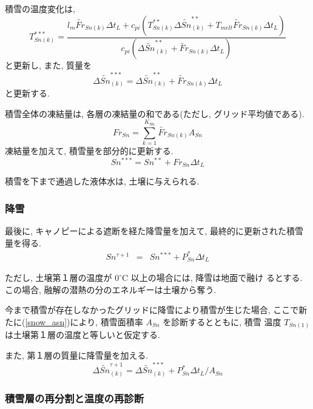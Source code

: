 積雪の温度変化は,
\begin{equation}
 T_{Sn(k)}^{***} = \frac{l_m \widetilde{Fr}_{Sn(k)}\Delta t_L
   +c_{pi}(T_{Sn(k)}^{**}\Delta \widetilde{Sn}_{(k)}^{**} + T_{melt} \widetilde{Fr}_{Sn(k)}\Delta t_L ) }
  {c_{pi} (\Delta \widetilde{Sn}_{(k)}^{**} + \widetilde{Fr}_{Sn(k)}\Delta t_L)}
\end{equation}
と更新し, また, 質量を
\begin{equation}
 \Delta \widetilde{Sn}_{(k)}^{***} = \Delta \widetilde{Sn}_{(k)}^{**} + \widetilde{Fr}_{Sn(k)}\Delta t_L
\end{equation}
と更新する.

積雪全体の凍結量は, 各層の凍結量の和である(ただし, グリッド平均値である).
\begin{equation}
 Fr_{Sn} = \sum_{k=1}^{K_{Sn}} \widetilde{Fr}_{Sn(k)} A_{Sn}
\end{equation}
凍結量を加えて, 積雪量を部分的に更新する.
\begin{equation}
 Sn^{***} = Sn^{**} + Fr_{Sn} \Delta t_L
\end{equation}

積雪を下まで通過した液体水は, 土壌に与えられる.

\subsubsection{降雪}

最後に, キャノピーによる遮断を経た降雪量を加えて, 最終的に更新された積雪
量を得る.
\begin{eqnarray}
 Sn^{\tau+1} &=& Sn^{***} + P_{Sn}^* \Delta t_L
\end{eqnarray}

ただし, 土壌第１層の温度が $0^{\circ}$C 以上の場合には, 降雪は地面で融け
るとする. この場合, 融解の潜熱の分のエネルギーは土壌から奪う.

今まで積雪が存在しなかったグリッドに降雪により積雪が生じた場合, ここで新
たに(\ref{snow_asn})により, 積雪面積率 $A_{Sn}$ を診断するとともに, 積雪
温度 $T_{Sn(1)}$ は土壌第１層の温度と等しいと仮定する.

また, 第１層の質量に降雪量を加える.
\begin{equation}
 \Delta \widetilde{Sn}_{(k)}^{\tau+1} = \Delta \widetilde{Sn}_{(k)}^{***} + P_{Sn}^* \Delta t_L /A_{Sn}
\end{equation}

\subsubsection{積雪層の再分割と温度の再診断}

